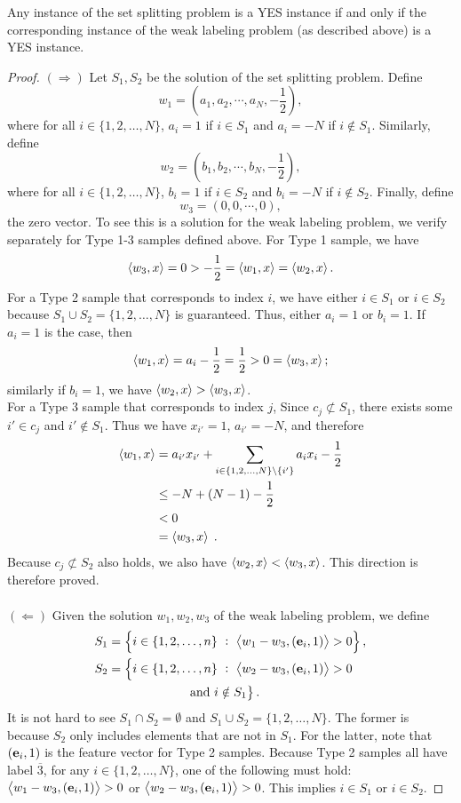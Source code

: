 \begin{lemma}
Any instance of the set splitting problem is a YES instance if and only if the
corresponding instance of the weak labeling problem (as described above) is a
YES instance.
\end{lemma}

\begin{proof}
$(\Longrightarrow)$ Let $S_1, S_2$ be the solution of the set splitting problem. Define
$$
w_1 = \left(a_1, a_2, \cdots, a_N, -\frac{1}{2}\right),
$$
where for all $i \in \{1,2,\dots,N\}$, $a_i=1$ if $i\in S_1$ and $a_i=-N$ if
$i\notin S_1$. Similarly, define
$$
w_2 = \left(b_1, b_2, \cdots, b_N, -\frac{1}{2}\right),
$$
where for all $i \in \{1,2,\dots,N\}$, $b_i=1$ if $i \in S_2$ and $b_i=-N$ if
$i\notin S_2$. Finally, define
$$
w_3 = (0,0,\cdots, 0),
$$
the zero vector. To see this is a solution for the weak labeling problem, we
verify separately for Type 1-3 samples defined above. For Type 1 sample, we have
$$
\left\langle w_3, x \right\rangle = 0 > -\frac{1}{2} = \left\langle w_1, x \right\rangle=\left\langle w_2, x \right\rangle.
$$
For a Type 2 sample that corresponds to index $i$, we have either $i\in S_1$ or
$i\in S_2$ because $S_1\cup S_2 = \{1,2,\dots,N\}$ is guaranteed. Thus, either
$a_i=1$ or $b_i=1$. If $a_i=1$ is the case, then
$$
\left\langle w_1, x \right\rangle = a_i - \frac{1}{2} = \frac{1}{2} > 0 = \left\langle w_3, x \right\rangle;
$$
similarly if $b_i=1$, we have $\left\langle w_2, x \right\rangle>\left\langle w_3, x \right\rangle$. \\ For a Type 3 sample
that corresponds to index $j$, Since $c_j \not\subset S_1$, there exists some
$i'\in c_j$ and $i'\notin S_1$. Thus we have $x_{i'}=1$, $a_{i'}=-N$, and
therefore
\begin{align*}
\left\langle w_1, x \right\rangle
& = a_{i'}x_{i'} + \sum_{i\in \{1,2,\dots,N\} \setminus \{i'\}} a_ix_i - \frac{1}{2} \\
& \le -N + (N-1)-\frac{1}{2} \\
& < 0  \\
& = \left\langle w_3, x \right\rangle \; .
\end{align*}
Because $c_j \not\subset S_2$ also holds, we also have
$\left\langle w_2, x \right\rangle<\left\langle w_3, x \right\rangle$. This direction is therefore proved. \\
\ \\
$(\Longleftarrow)$ Given the solution $w_1, w_2, w_3$ of the weak labeling problem, we define
\begin{align*}
S_1 &= \left\{i \in \{1,2,\dots,n\} ~:~ \left\langle w_1-w_3, (\mathbf{e}_i, 1) \right\rangle > 0 \right\}, \\
S_2 &= \left\{i \in \{1,2,\dots,n\} ~:~ \left\langle w_2-w_3, (\mathbf{e}_i, 1) \right\rangle > 0 \right. \\
& \qquad \qquad \qquad \left. \text{\ and\ } i \notin S_1 \right\}.
\end{align*}
It is not hard to see $S_1 \cap S_2 = \emptyset$ and $S_1\cup S_2 =
\{1,2,\dots,N\}$. The former is because $S_2$ only includes elements that are
not in $S_1$. For the latter, note that $(\mathbf{e}_i, 1)$ is the feature vector for
Type 2 samples. Because Type 2 samples all have label $\overline{3}$, for any $i
\in \{1,2,\dots,N\}$, one of the following must hold: $\left\langle w_1-w_3, (\mathbf{e}_i,
1) \right\rangle>0$ or $\left\langle w_2-w_3, (\mathbf{e}_i, 1) \right\rangle>0$. This implies $i\in S_1$ or $i\in S_2$.


\end{proof}
